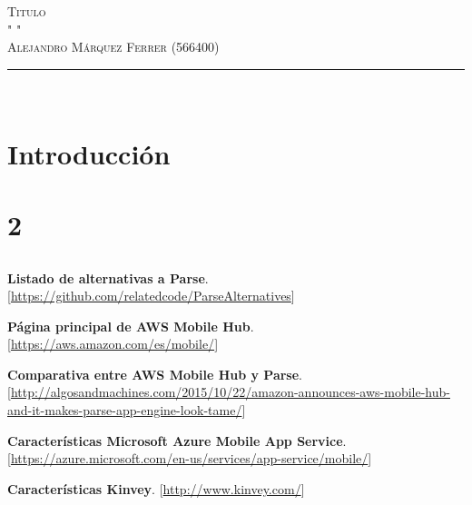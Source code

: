 \documentclass[a4paper]{article}
\newcommand{\HRule}{\rule{\linewidth}{0.35mm}}
\begin{document}
\marginsize{3cm}{3cm}{2.5cm}{2.5cm} 

\begin{flushright}
	\textsc{\huge Titulo\\}
	\textsc{\tiny " "\\}
	\textsc{\large
		Alejandro Márquez Ferrer (566400)\\
    }
	\HRule \\
\end{flushright}

\section{Introducción}

	\paragraph{}
    
\section{2}

\subsection{}

	\paragraph{}
    
\begin{thebibliography}{99} 
 \textbf{Listado de alternativas a Parse}. [\url{https://github.com/relatedcode/ParseAlternatives}]

 \textbf{Página principal de AWS Mobile Hub}. [\url {https://aws.amazon.com/es/mobile/}]

 \textbf{Comparativa entre AWS Mobile Hub y Parse}. [\url {http://algosandmachines.com/2015/10/22/amazon-announces-aws-mobile-hub-and-it-makes-parse-app-engine-look-tame/}]

 \textbf{Características Microsoft Azure Mobile App Service}. [\url {https://azure.microsoft.com/en-us/services/app-service/mobile/}]

 \textbf{Características Kinvey}. [\url {http://www.kinvey.com/}]

\end{thebibliography}
\end{document}
